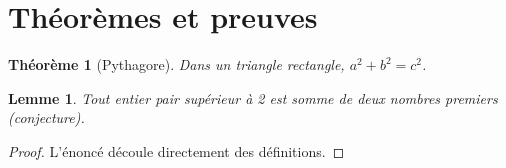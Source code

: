 \documentclass{article}
\newtheorem{theorem}{Th\'eor\`eme}
\newtheorem{lemma}{Lemme}
\begin{document}
\hsize=380pt
\section{Th\'eor\`emes et preuves}
\begin{theorem}[Pythagore]
Dans un triangle rectangle, $a^2 + b^2 = c^2$.
\end{theorem}
\begin{lemma}
Tout entier pair sup\'erieur \`a 2 est somme de deux nombres premiers (conjecture).
\end{lemma}
\begin{proof}
L'\'enonc\'e d\'ecoule directement des d\'efinitions.
\end{proof}
\end{document}
